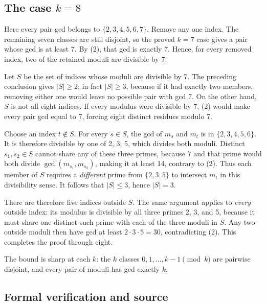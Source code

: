\documentclass[11pt,a4paper]{article}
\begin{document}
\subsection{\texorpdfstring{The case \(k=8\)}{The case k=8}}\label{the-case-k8}

Here every pair gcd belongs to \(\{2,3,4,5,6,7\}\). Remove any one index. The remaining seven classes are still disjoint, so the proved \(k=7\) case gives a pair whose gcd is at least 7. By (2), that gcd is exactly 7. Hence, for every removed index, two of the retained moduli are divisible by 7.

Let \(S\) be the set of indices whose moduli are divisible by 7. The preceding conclusion gives \(|S|\ge2\); in fact \(|S|\ge3\), because if it had exactly two members, removing either one would leave no possible pair with gcd 7. On the other hand, \(S\) is not all eight indices. If every modulus were divisible by 7, (2) would make every pair gcd equal to 7, forcing eight distinct residues modulo 7.

Choose an index \(t\notin S\). For every \(s\in S\), the gcd of \(m_s\) and \(m_t\) is in \(\{2,3,4,5,6\}\). It is therefore divisible by one of 2, 3, 5, which divides both moduli. Distinct \(s_1,s_2\in S\) cannot share any of these three primes, because \(7\) and that prime would both divide \(\gcd(m_{s_1},m_{s_2})\), making it at least 14, contrary to (2). Thus each member of \(S\) requires a \emph{different} prime from \(\{2,3,5\}\) to intersect \(m_t\) in this divisibility sense. It follows that \(|S|\le3\), hence \(|S|=3\).

There are therefore five indices outside \(S\). The same argument applies to \emph{every} outside index: its modulus is divisible by all three primes 2, 3, and 5, because it must share one distinct such prime with each of the three moduli in \(S\). Any two outside moduli then have gcd at least \(2\cdot3\cdot5=30\), contradicting (2). This completes the proof through eight.

The bound is sharp at each \(k\): the \(k\) classes \(0,1,\ldots,k-1\pmod k\) are pairwise disjoint, and every pair of moduli has gcd exactly \(k\).

\subsection{Formal verification and source}\label{formal-verification-and-source}
\end{document}
